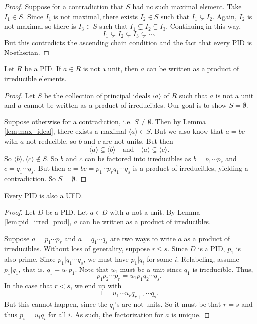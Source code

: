 \begin{proof}
	Suppose for a contradiction that $S$ had no such maximal element. Take $I_1\in S$. Since $I_1$ is not maximal, there exists $I_2\in S$ such that $I_1\subsetneq I_2$. Again, $I_2$ is not maximal so there is $I_3\in S$ such that $I_1\subsetneq I_2\subsetneq I_3$. Continuing in this way,
	$$I_1\subsetneq I_2\subsetneq I_3\subsetneq\cdots.$$
	But this contradicts the ascending chain condition and the fact that every PID is Noetherian.
\end{proof}

\begin{lemma}\label{lem:pid_irred_prod}
	Let $R$ be a PID. If $a\in R$ is not a unit, then $a$ can be written as a product of irreducible elements.
\end{lemma}

\begin{proof}
	Let $S$ be the collection of principal ideals $\langle a\rangle$ of $R$ such that $a$ is not a unit and $a$ cannot be written as a product of irreducibles. Our goal is to show $S=\emptyset$.

	Suppose otherwise for a contradiction, i.e. $S\neq\emptyset$. Then by Lemma \ref{lem:max_ideal}, there exists a maximal $\langle a\rangle\in S$. But we also know that $a=bc$ with $a$ not reducible, so $b$ and $c$ are not units. But then
	$$\langle a\rangle\subseteq\langle b\rangle\quad\text{and}\quad\langle a\rangle\subseteq\langle c\rangle.$$
	So $\langle b\rangle,\langle c\rangle\notin S$. So $b$ and $c$ can be factored into irreducibles as $b=p_1\cdots p_r$ and $c=q_1\cdots q_s$. But then $a=bc=p_1\cdots p_rq_1\cdots q_s$ is a product of irreducibles, yielding a contradiction. So $S=\emptyset$.
\end{proof}

\begin{theorem}\label{thm:pid_is_ufd}
	Every PID is also a UFD.
\end{theorem}

\begin{proof}
	Let $D$ be a PID. Let $a\in D$ with $a$ not a unit. By Lemma \ref{lem:pid_irred_prod}, $a$ can be written as a product of irreducibles.

	Suppose $a=p_1\cdots p_r$ and $a=q_1\cdots q_s$ are two ways to write $a$ as a product of irreducibles. Without loss of generality, suppose $r\leq s$. Since $D$ is a PID, $p_1$ is also prime. Since $p_1|q_1\cdots q_s$, we must have $p_1|q_i$ for some $i$. Relabeling, assume $p_1|q_1$, that is, $q_1=u_1p_1$. Note that $u_1$ must be a unit since $q_1$ is irreducible. Thus,
	$$p_1p_2\cdots p_r=u_1p_1q_2\cdots q_s.$$
	In the case that $r<s$, we end up with
	$$1=u_1\cdots u_rq_{r+1}\cdots q_s.$$
	But this cannot happen, since the $q_i$'s are not units. So it must be that $r=s$ and thus $p_i=u_iq_i$ for all $i$. As such, the factorization for $a$ is unique.
\end{proof}


